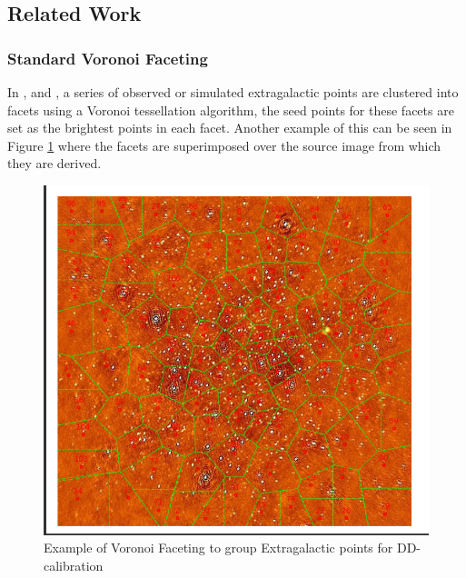 \subsection{Related Work}\label{ra:sec:rw}
%
\subsubsection{Standard Voronoi Faceting}\label{ra:ssec:svf}
In \citet{tasse2014applying}, \citet{smirnov2015radio} and \citet{van2016lofar}, a series of observed or simulated extragalactic points are clustered into facets using a Voronoi tessellation algorithm, the seed points for these facets are set as the brightest points in each facet. Another example of this can be seen in Figure \ref{tes:fig:stelvor} where the facets are superimposed over the source image from which they are derived.
%
\begin{figure}[H]
    \centering
    \includegraphics[scale=0.4]{Images/tessellation.png}
    \caption{Example of Voronoi Faceting to group Extragalactic points for DD-calibration}
    \label{tes:fig:stelvor}
\end{figure}
